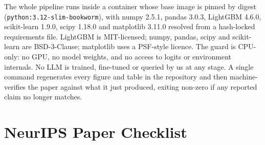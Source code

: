 \documentclass{article}
\begin{document}
The whole pipeline runs inside a container whose base image is pinned by digest
(\texttt{python:3.12-slim-bookworm}), with numpy 2.5.1, pandas 3.0.3, LightGBM 4.6.0,
scikit-learn 1.9.0, scipy 1.18.0 and matplotlib 3.11.0 resolved from a hash-locked
requirements file. LightGBM is MIT-licensed; numpy, pandas, scipy and scikit-learn are
BSD-3-Clause; matplotlib uses a PSF-style licence. The guard is CPU-only: no GPU, no
model weights, and no access to logits or environment internals. No LLM is trained,
fine-tuned or queried by us at any stage. A single command regenerates every figure and
table in the repository and then machine-verifies the paper against what it just
produced, exiting non-zero if any reported claim no longer matches.

\section*{NeurIPS Paper Checklist}
\end{document}
